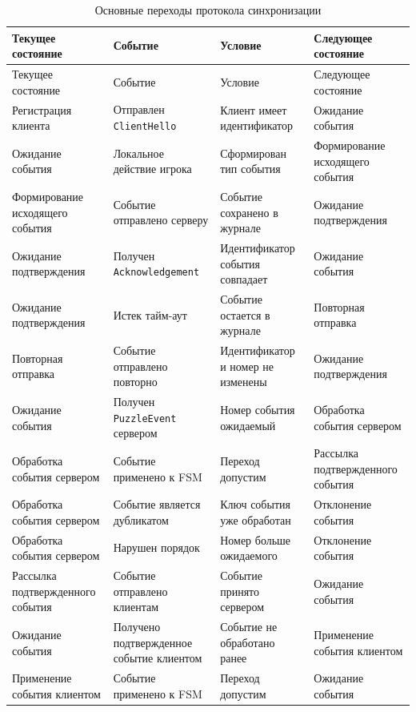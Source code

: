 {
	\renewcommand{\arraystretch}{1.2}
	\begin{longtable}{|p{3.4cm}|p{4.3cm}|p{3.7cm}|p{3cm}|}
		\caption{Основные переходы протокола синхронизации}
		\label{tab:fsm-transitions}\\
		\hline
		Текущее состояние & Событие & Условие & Следующее состояние \\ \hline
		\endfirsthead
		\hline
		Текущее состояние & Событие & Условие & Следующее состояние \\ \hline
		\endhead
		Регистрация клиента & Отправлен \texttt{ClientHello} & Клиент имеет идентификатор & Ожидание события \\ \hline
		Ожидание события & Локальное действие игрока & Сформирован тип события & Формирование исходящего события \\ \hline
		Формирование исходящего события & Событие отправлено серверу & Событие сохранено в журнале & Ожидание подтверждения \\ \hline
		Ожидание подтверждения & Получен \texttt{Acknowledgement} & Идентификатор события совпадает & Ожидание события \\ \hline
		Ожидание подтверждения & Истек тайм-аут & Событие остается в журнале & Повторная отправка \\ \hline
		Повторная отправка & Событие отправлено повторно & Идентификатор и номер не изменены & Ожидание подтверждения \\ \hline
		Ожидание события & Получен \texttt{PuzzleEvent} сервером & Номер события ожидаемый & Обработка события сервером \\ \hline
		Обработка события сервером & Событие применено к FSM & Переход допустим & Рассылка подтвержденного события \\ \hline
		Обработка события сервером & Событие является дубликатом & Ключ события уже обработан & Отклонение события \\ \hline
		Обработка события сервером & Нарушен порядок & Номер больше ожидаемого & Отклонение события \\ \hline
		\pagebreak
		Рассылка подтвержденного события & Событие отправлено клиентам & Событие принято сервером & Ожидание события \\ \hline
		Ожидание события & Получено подтвержденное событие клиентом & Событие не обработано ранее & Применение события клиентом \\ \hline
		Применение события клиентом & Событие применено к FSM & Переход допустим & Ожидание события \\ \hline
	\end{longtable}
}

